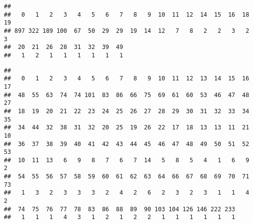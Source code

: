 \documentclass[]{article}
\newenvironment{Shaded}{\begin{snugshade}}{\end{snugshade}}
\newcommand{\KeywordTok}[1]{\textcolor[rgb]{0.13,0.29,0.53}{\textbf{#1}}}
\newcommand{\ControlFlowTok}[1]{\textcolor[rgb]{0.13,0.29,0.53}{\textbf{#1}}}
\newcommand{\OperatorTok}[1]{\textcolor[rgb]{0.81,0.36,0.00}{\textbf{#1}}}
\newcommand{\NormalTok}[1]{#1}
\begin{document}
\begin{Shaded}
\end{Shaded}

\begin{verbatim}
## 
##   0   1   2   3   4   5   6   7   8   9  10  11  12  14  15  16  18  19 
## 897 322 189 100  67  50  29  29  19  14  12   7   8   2   2   3   2   3 
##  20  21  26  28  31  32  39  49 
##   1   2   1   1   1   1   1   1
\end{verbatim}

\begin{Shaded}
\end{Shaded}

\begin{verbatim}
## 
##   0   1   2   3   4   5   6   7   8   9  10  11  12  13  14  15  16  17 
##  48  55  63  74  74 101  83  86  66  75  69  61  60  53  46  47  48  27 
##  18  19  20  21  22  23  24  25  26  27  28  29  30  31  32  33  34  35 
##  34  44  32  38  31  32  20  25  19  26  22  17  18  13  13  11  21  10 
##  36  37  38  39  40  41  42  43  44  45  46  47  48  49  50  51  52  53 
##  10  11  13   6   9   8   7   6   7  14   5   8   5   4   1   6   9   2 
##  54  55  56  57  58  59  60  61  62  63  64  66  67  68  69  70  71  73 
##   1   3   2   3   3   3   2   4   2   6   2   3   2   3   1   1   4   2 
##  74  75  76  77  78  83  86  88  89  90 103 104 126 146 222 233 
##   1   1   1   4   3   1   2   1   2   2   1   1   1   1   1   1
\end{verbatim}

\begin{Shaded}
\end{Shaded}
\end{document}
